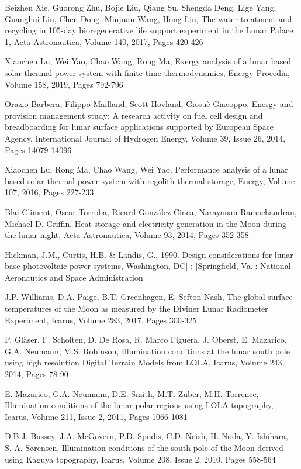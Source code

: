 \documentclass[prl,onecolumn]{revtex4-1}  %
\begin{document}
\begin{thebibliography}{99}
Beizhen Xie, Guorong Zhu, Bojie Liu, Qiang Su, Shengda Deng, Lige Yang, Guanghui Liu, Chen Dong, Minjuan Wang, Hong Liu,
The water treatment and recycling in 105-day bioregenerative life support experiment in the Lunar Palace 1,
Acta Astronautica,
Volume 140,
2017,
Pages 420-426


Xiaochen Lu, Wei Yao, Chao Wang, Rong Ma,
Exergy analysis of a lunar based solar thermal power system with finite-time thermodynamics,
Energy Procedia,
Volume 158,
2019,
Pages 792-796


Orazio Barbera, Filippo Mailland, Scott Hovland, Giosuè Giacoppo,
Energy and provision management study: A research activity on fuel cell design and breadboarding for lunar surface applications supported by European Space Agency,
International Journal of Hydrogen Energy,
Volume 39, Issue 26,
2014,
Pages 14079-14096

Xiaochen Lu, Rong Ma, Chao Wang, Wei Yao,
Performance analysis of a lunar based solar thermal power system with regolith thermal storage,
Energy,
Volume 107,
2016,
Pages 227-233

Blai Climent, Oscar Torroba, Ricard González-Cinca, Narayanan Ramachandran, Michael D. Griffin,
Heat storage and electricity generation in the Moon during the lunar night,
Acta Astronautica,
Volume 93,
2014,
Pages 352-358

Hickman, J.M., Curtis, H.B. \& Landis, G., 1990. Design considerations for lunar base photovoltaic power systems, Washington, DC] : [Springfield, Va.]: National Aeronautics and Space Administration


J.P. Williams, D.A. Paige, B.T. Greenhagen, E. Sefton-Nash,
The global surface temperatures of the Moon as measured by the Diviner Lunar Radiometer Experiment,
Icarus,
Volume 283,
2017,
Pages 300-325


P. Gl{\"a}ser, F. Scholten, D. De Rosa, R. Marco Figuera, J. Oberst, E. Mazarico, G.A. Neumann, M.S. Robinson,
Illumination conditions at the lunar south pole using high resolution Digital Terrain Models from LOLA,
Icarus,
Volume 243,
2014,
Pages 78-90


E. Mazarico, G.A. Neumann, D.E. Smith, M.T. Zuber, M.H. Torrence,
Illumination conditions of the lunar polar regions using LOLA topography,
Icarus,
Volume 211, Issue 2,
2011,
Pages 1066-1081


D.B.J. Bussey, J.A. McGovern, P.D. Spudis, C.D. Neish, H. Noda, Y. Ishihara, S.-A. Sørensen,
Illumination conditions of the south pole of the Moon derived using Kaguya topography,
Icarus,
Volume 208, Issue 2,
2010,
Pages 558-564



\end{thebibliography}
\end{document}
